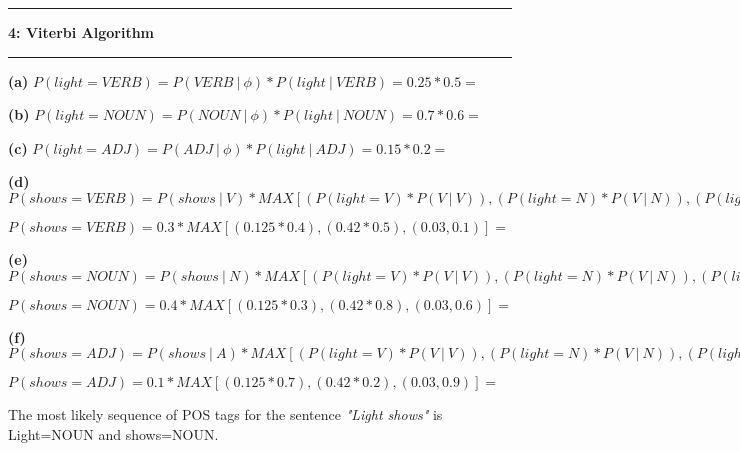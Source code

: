 \documentclass[11pt]{article}
\newcommand\question[2]{\vspace{.25in}\hrule\textbf{#1: #2}\vspace{.5em}\hrule\vspace{.10in}}
\renewcommand\part[1]{\vspace{.10in}\textbf{(#1)}}
\begin{document}
\newpage

\question{4}{Viterbi Algorithm}

\part{a} $P(light=VERB) = P(VERB\ | \ \phi) * P(light \ | \ VERB) = 0.25 * 0.5 =$ 

\part{b} $P(light=NOUN) = P(NOUN \ | \ \phi) * P(light \ | \ NOUN) = 0.7 * 0.6 =$ 

\part{c} $P(light=ADJ) = P(ADJ \ | \ \phi) * P(light \ | \ ADJ) = 0.15 * 0.2 =$ 

\part{d} $P(shows=VERB) = P(shows \ | \ V) * MAX[(P(light=V) * P(V \ | \ V)), (P(light=N) * P(V \ | \ N)), (P(light=A) * P(V \ | \ A))]$

$P(shows=VERB) = 0.3 * MAX[(0.125 * 0.4), (0.42 * 0.5), (0.03, 0.1)] = $  

\part{e} $P(shows=NOUN) = P(shows \ | \ N) * MAX[(P(light=V) * P(V \ | \ V)), (P(light=N) * P(V \ | \ N)), (P(light=A) * P(VE \ | \ A))]$

$P(shows=NOUN) = 0.4 * MAX[(0.125 * 0.3), (0.42 * 0.8), (0.03, 0.6)] =$ 

\part{f} $P(shows=ADJ) = P(shows \ | \ A) * MAX[(P(light=V) * P(V \ | \ V)), (P(light=N) * P(V \ | \ N)), (P(light=A) * P(V \ | \ A))]$

$P(shows=ADJ) = 0.1 * MAX[(0.125 * 0.7), (0.42 * 0.2), (0.03, 0.9)] =$ 

The most likely sequence of POS tags for the sentence \textit{"Light shows"} is Light=NOUN and shows=NOUN.

\end{document}
